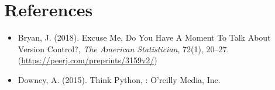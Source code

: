 \documentclass[a4paper]{article}
\begin{document}
\section{References}
\label{sec:org7388575}
\begin{itemize}
\item Bryan, J. (2018). Excuse Me, Do You Have A Moment To Talk About Version Control?, \textit{The American Statistician}, 72(1), 20–27. (\url{https://peerj.com/preprints/3159v2/})
\item Downey, A. (2015). Think Python, : O'reilly Media, Inc.
\end{itemize}
\end{document}

